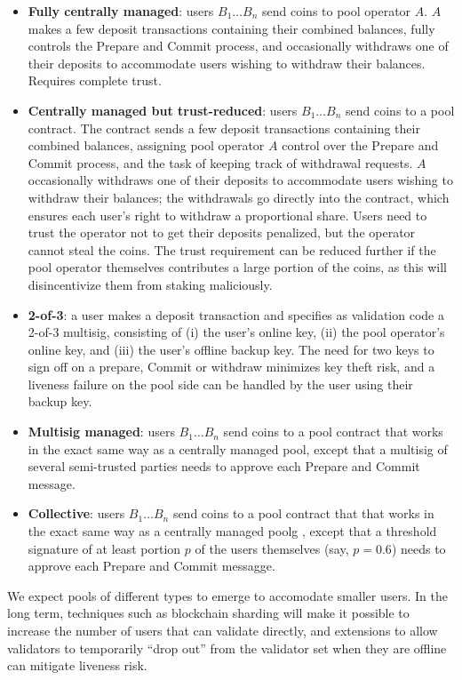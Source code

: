 \documentclass[12pt, final]{article}
\begin{document}
\begin{itemize}
\item \textbf{Fully centrally managed}: users $B_1 \ldots B_n$ send coins to pool operator $A$. $A$ makes a few deposit transactions containing their combined balances, fully controls the Prepare and Commit process, and occasionally withdraws one of their deposits to accommodate users wishing to withdraw their balances. Requires complete trust.
\item \textbf{Centrally managed but trust-reduced}: users $B_1 \ldots B_n$ send coins to a pool contract. The contract sends a few deposit transactions containing their combined balances, assigning pool operator $A$ control over the Prepare and Commit process, and the task of keeping track of withdrawal requests. $A$ occasionally withdraws one of their deposits to accommodate users wishing to withdraw their balances; the withdrawals go directly into the contract, which ensures each user's right to withdraw a proportional share. Users need to trust the operator not to get their deposits penalized, but the operator cannot steal the coins. The trust requirement can be reduced further if the pool operator themselves contributes a large portion of the coins, as this will disincentivize them from staking maliciously.
\item \textbf{2-of-3}: a user makes a deposit transaction and specifies as validation code a 2-of-3 multisig, consisting of (i) the user's online key, (ii) the pool operator's online key, and (iii) the user's offline backup key. The need for two keys to sign off on a prepare, Commit or withdraw minimizes key theft risk, and a liveness failure on the pool side can be handled by the user using their backup key.
\item \textbf{Multisig managed}: users $B_1 \ldots B_n$ send coins to a pool contract that works in the exact same way as a centrally managed pool, except that a multisig of several semi-trusted parties needs to approve each Prepare and Commit message.
\item \textbf{Collective}: users $B_1 \ldots B_n$ send coins to a pool contract that that works in the exact same way as a centrally managed poolg
, except that a threshold signature of at least portion $p$ of the users themselves (say, $p = 0.6$) needs to approve each Prepare and Commit messagge.
\end{itemize}

We expect pools of different types to emerge to accomodate smaller users. In the long term, techniques such as blockchain sharding will make it possible to increase the number of users that can validate directly, and extensions to allow validators to temporarily ``drop out'' from the validator set when they are offline can mitigate liveness risk.
\end{document}

